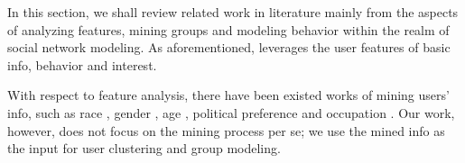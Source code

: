 

In this section, we shall review related work in literature mainly from the aspects of analyzing features, mining groups and modeling behavior within the realm of social network modeling.
As aforementioned, \sys{} leverages the user features of basic info, behavior and interest.

With respect to feature analysis, there have been existed works of mining users' info, such as race \cite{IEEEexample:conf/icwsm/PennacchiottiP11}, gender \cite{IEEEexample:conf/emnlp/CiotSR13}, age \cite{IEEEexample:conf/icde/ParkHHL09}, political preference \cite{IEEEexample:conf/icwsm/PennacchiottiP11,IEEEexample:conf/acl/VolkovaCD14,IEEEexample:kosinski2013private} and occupation \cite{IEEEexample:journals/tmm/FangSXH15,IEEEexample:conf/icde/FanCTWC16}.
Our work, however, does not focus on the mining process per se; we use the mined info as the input for user clustering and group modeling.

